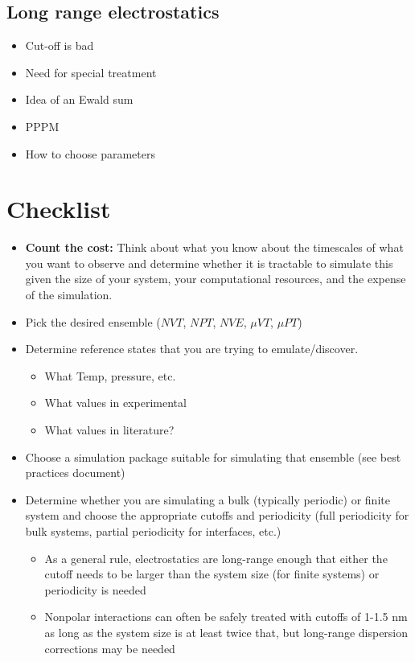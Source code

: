 \documentclass[9pt,bestpractices]{livecoms}
\begin{document}
\subsection{Long range electrostatics}
\begin{itemize}
\item Cut-off is bad
\item Need for special treatment
\item Idea of an Ewald sum
\item PPPM 
\item How to choose parameters
\end{itemize}

\section{Checklist}
\begin{itemize}
\item \textbf{Count the cost:} Think about what you know about the timescales of what you want to observe and determine whether it is tractable to simulate this given the size of your system, your computational resources, and the expense of the simulation.
\item Pick the desired ensemble ($NVT$, $NPT$, $NVE$, $\mu VT$, $\mu PT$)
\item Determine reference states that you are trying to emulate/discover.
\begin{itemize}
\item What Temp, pressure, etc.
\item What values in experimental
\item What values in literature?
\end{itemize}
\item Choose a simulation package suitable for simulating that ensemble (see best practices document) 
\item Determine whether you are simulating a bulk (typically periodic) or finite system and choose the appropriate cutoffs and periodicity (full periodicity for bulk systems, partial periodicity for interfaces, etc.)
\begin{itemize}
\item As a general rule, electrostatics are long-range enough that either the cutoff needs to be larger than the system size (for finite systems) or periodicity is needed
\item Nonpolar interactions can often be safely treated with cutoffs of 1-1.5 nm as long as the system size is at least twice that, but long-range dispersion corrections may be needed

\end{itemize}
\end{itemize}
\end{document}
